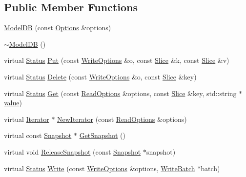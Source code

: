 \subsection*{Public Member Functions}
\begin{DoxyCompactItemize}
\item 
\mbox{\hyperlink{classleveldb_1_1_model_d_b_ac0117ce964631ff7977b465de053a282}{Model\+DB}} (const \mbox{\hyperlink{structleveldb_1_1_options}{Options}} \&options)
\item 
\mbox{\hyperlink{classleveldb_1_1_model_d_b_a35e9042c7ed06e8324d5e40318771825}{$\sim$\+Model\+DB}} ()
\item 
virtual \mbox{\hyperlink{classleveldb_1_1_status}{Status}} \mbox{\hyperlink{classleveldb_1_1_model_d_b_a83d0ace11c8ff079f4e6eaa905744253}{Put}} (const \mbox{\hyperlink{structleveldb_1_1_write_options}{Write\+Options}} \&o, const \mbox{\hyperlink{classleveldb_1_1_slice}{Slice}} \&k, const \mbox{\hyperlink{classleveldb_1_1_slice}{Slice}} \&v)
\item 
virtual \mbox{\hyperlink{classleveldb_1_1_status}{Status}} \mbox{\hyperlink{classleveldb_1_1_model_d_b_a2c2690e07a206fd2197f592dd4478ff6}{Delete}} (const \mbox{\hyperlink{structleveldb_1_1_write_options}{Write\+Options}} \&o, const \mbox{\hyperlink{classleveldb_1_1_slice}{Slice}} \&key)
\item 
virtual \mbox{\hyperlink{classleveldb_1_1_status}{Status}} \mbox{\hyperlink{classleveldb_1_1_model_d_b_ab7744a74b5c0d2cd812dd87e83ca561b}{Get}} (const \mbox{\hyperlink{structleveldb_1_1_read_options}{Read\+Options}} \&options, const \mbox{\hyperlink{classleveldb_1_1_slice}{Slice}} \&key, std\+::string $\ast$\mbox{\hyperlink{version__set_8cc_a38c8b88c432e666ad10b0c5573e1160a}{value}})
\item 
virtual \mbox{\hyperlink{classleveldb_1_1_iterator}{Iterator}} $\ast$ \mbox{\hyperlink{classleveldb_1_1_model_d_b_a5acf23bae313f2e2f3ea9f0ab95450cf}{New\+Iterator}} (const \mbox{\hyperlink{structleveldb_1_1_read_options}{Read\+Options}} \&options)
\item 
virtual const \mbox{\hyperlink{classleveldb_1_1_snapshot}{Snapshot}} $\ast$ \mbox{\hyperlink{classleveldb_1_1_model_d_b_aa82849af6a149d122e65a4aac412903f}{Get\+Snapshot}} ()
\item 
virtual void \mbox{\hyperlink{classleveldb_1_1_model_d_b_a3f5d86ce612baaa88c11601c9a59df12}{Release\+Snapshot}} (const \mbox{\hyperlink{classleveldb_1_1_snapshot}{Snapshot}} $\ast$snapshot)
\item 
virtual \mbox{\hyperlink{classleveldb_1_1_status}{Status}} \mbox{\hyperlink{classleveldb_1_1_model_d_b_ae3a20d2fc971376349b142b9c2d159be}{Write}} (const \mbox{\hyperlink{structleveldb_1_1_write_options}{Write\+Options}} \&options, \mbox{\hyperlink{classleveldb_1_1_write_batch}{Write\+Batch}} $\ast$batch)

\end{DoxyCompactItemize}
